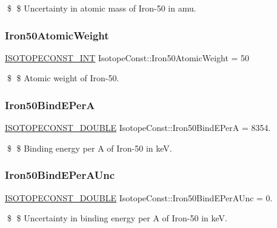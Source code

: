 \$ \$ Uncertainty in atomic mass of Iron-\/50 in amu. \mbox{\label{group___isotope_const-_iron-_fe50_gaeb366bc7c61ac60fc47a75a2a9d83193}} 
\subsubsection{\texorpdfstring{Iron50\+Atomic\+Weight}{Iron50AtomicWeight}}
{\footnotesize\ttfamily \mbox{\hyperlink{group___isotope_const-_macros_ga5f18360b3e99483a35c32d789e62621c}{I\+S\+O\+T\+O\+P\+E\+C\+O\+N\+S\+T\+\_\+\+I\+NT}} Isotope\+Const\+::\+Iron50\+Atomic\+Weight = 50}

\$ \$ Atomic weight of Iron-\/50. \mbox{\label{group___isotope_const-_iron-_fe50_ga25e87299a1d6b11489009c1eaedbc073}} 
\subsubsection{\texorpdfstring{Iron50\+Bind\+E\+PerA}{Iron50BindEPerA}}
{\footnotesize\ttfamily \mbox{\hyperlink{group___isotope_const-_macros_ga8f45a7272ce02c0b4c65c44636ed719a}{I\+S\+O\+T\+O\+P\+E\+C\+O\+N\+S\+T\+\_\+\+D\+O\+U\+B\+LE}} Isotope\+Const\+::\+Iron50\+Bind\+E\+PerA = 8354.}

\$ \$ Binding energy per A of Iron-\/50 in keV. \mbox{\label{group___isotope_const-_iron-_fe50_ga8ddc6c39919f979d7fcee6b48287329a}} 
\subsubsection{\texorpdfstring{Iron50\+Bind\+E\+Per\+A\+Unc}{Iron50BindEPerAUnc}}
{\footnotesize\ttfamily \mbox{\hyperlink{group___isotope_const-_macros_ga8f45a7272ce02c0b4c65c44636ed719a}{I\+S\+O\+T\+O\+P\+E\+C\+O\+N\+S\+T\+\_\+\+D\+O\+U\+B\+LE}} Isotope\+Const\+::\+Iron50\+Bind\+E\+Per\+A\+Unc = 0.}

\$ \$ Uncertainty in binding energy per A of Iron-\/50 in keV. \mbox{\label{group___isotope_const-_iron-_fe50_ga166c0496d36c23f867f815079e61e4d4}} 
